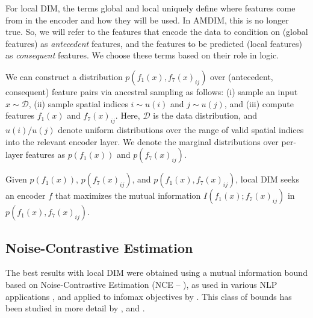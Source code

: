 \documentclass{article}
\newcommand{\DD}{\mathcal{D}}
\begin{document}
For local DIM, the terms global and local uniquely define where features come from in the encoder and how they will be used.
In AMDIM, this is no longer true. So, we will refer to the features that encode the data to condition on (global features) as \emph{antecedent} features, and the features to be predicted (local features) as \emph{consequent} features. We choose these terms based on their role in logic.

We can construct a distribution $p(f_1(x), f_7(x)_{ij})$ over (antecedent, consequent) feature pairs via ancestral sampling as follows: (i) sample an input $x \sim \DD$, (ii) sample spatial indices $i \sim u(i)$ and $j \sim u(j)$, and (iii) compute features $f_1(x)$ and $f_7(x)_{ij}$. Here, $\DD$ is the data distribution, and $u(i)/u(j)$ denote uniform distributions over the range of valid spatial indices into the relevant encoder layer. We denote the marginal distributions over per-layer features as $p(f_1(x))$ and $p(f_7(x)_{ij})$.

Given $p(f_1(x))$, $p(f_7(x)_{ij})$, and $p(f_1(x), f_7(x)_{ij})$, local DIM seeks an encoder $f$ that maximizes the mutual information $I(f_1(x); f_7(x)_{ij})$ in $p(f_1(x), f_7(x)_{ij})$.

\subsection{Noise-Contrastive Estimation}
The best results with local DIM were obtained using a mutual information bound based on Noise-Contrastive Estimation (NCE -- \citep{Gutmann2010}), as used in various NLP applications \citep{Ma2018}, and applied to infomax objectives by \citet{vandenOord2018}. This class of bounds has been studied in more detail by \cite{McAllester2018}, and \cite{Poole2019}.
\end{document}

